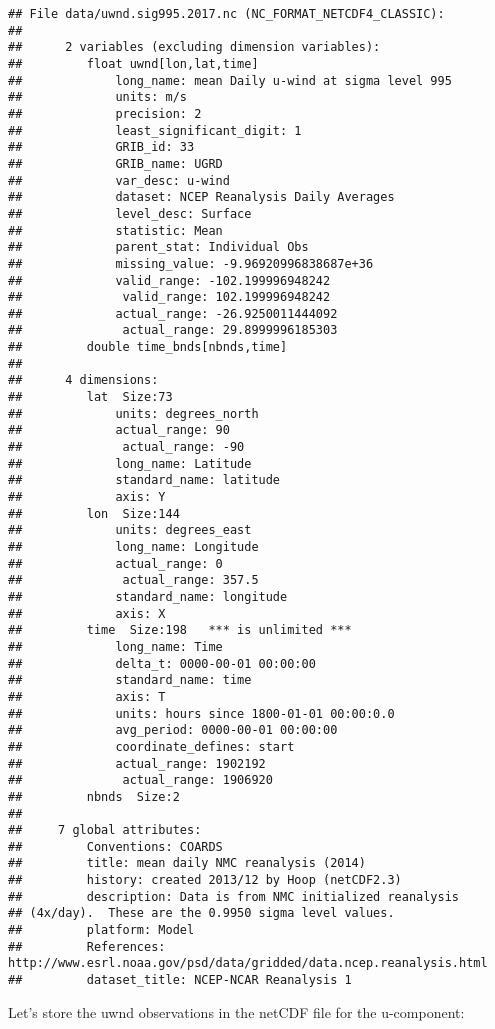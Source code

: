 \documentclass[]{book}
\theoremstyle{definition}
\theoremstyle{definition}
\theoremstyle{remark}
\begin{document}
\begin{verbatim}
## File data/uwnd.sig995.2017.nc (NC_FORMAT_NETCDF4_CLASSIC):
## 
##      2 variables (excluding dimension variables):
##         float uwnd[lon,lat,time]   
##             long_name: mean Daily u-wind at sigma level 995
##             units: m/s
##             precision: 2
##             least_significant_digit: 1
##             GRIB_id: 33
##             GRIB_name: UGRD
##             var_desc: u-wind
##             dataset: NCEP Reanalysis Daily Averages
##             level_desc: Surface
##             statistic: Mean
##             parent_stat: Individual Obs
##             missing_value: -9.96920996838687e+36
##             valid_range: -102.199996948242
##              valid_range: 102.199996948242
##             actual_range: -26.9250011444092
##              actual_range: 29.8999996185303
##         double time_bnds[nbnds,time]   
## 
##      4 dimensions:
##         lat  Size:73
##             units: degrees_north
##             actual_range: 90
##              actual_range: -90
##             long_name: Latitude
##             standard_name: latitude
##             axis: Y
##         lon  Size:144
##             units: degrees_east
##             long_name: Longitude
##             actual_range: 0
##              actual_range: 357.5
##             standard_name: longitude
##             axis: X
##         time  Size:198   *** is unlimited ***
##             long_name: Time
##             delta_t: 0000-00-01 00:00:00
##             standard_name: time
##             axis: T
##             units: hours since 1800-01-01 00:00:0.0
##             avg_period: 0000-00-01 00:00:00
##             coordinate_defines: start
##             actual_range: 1902192
##              actual_range: 1906920
##         nbnds  Size:2
## 
##     7 global attributes:
##         Conventions: COARDS
##         title: mean daily NMC reanalysis (2014)
##         history: created 2013/12 by Hoop (netCDF2.3)
##         description: Data is from NMC initialized reanalysis
## (4x/day).  These are the 0.9950 sigma level values.
##         platform: Model
##         References: http://www.esrl.noaa.gov/psd/data/gridded/data.ncep.reanalysis.html
##         dataset_title: NCEP-NCAR Reanalysis 1
\end{verbatim}

Let's store the uwnd observations in the netCDF file for the
u-component:
\end{document}
